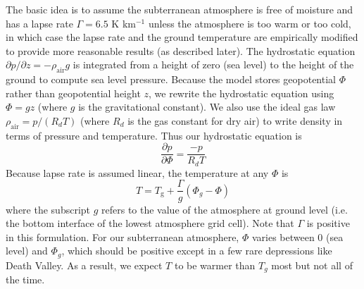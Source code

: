The basic idea is to assume the subterranean atmosphere is free of moisture and has a lapse rate $\Gamma = 6.5$ K km$^{-1}$ unless the atmosphere is too warm or too cold, in which case the lapse rate and the ground temperature are empirically modified to provide more reasonable results (as described later). The hydrostatic equation $\partial p/\partial z = -\rho_\mathrm{air} g$ is integrated from a height of zero (sea level) to the height of the ground to compute sea level pressure. Because the model stores geopotential $\Phi$ rather than geopotential height $z$, we rewrite the hydrostatic equation using $\Phi = gz$ (where $g$ is the gravitational constant). We also use the ideal gas law $\rho_\mathrm{air} = p/(R_d T)$ (where $R_d$ is the gas constant for dry air) to write density in terms of pressure and temperature. Thus our hydrostatic equation is
\begin{equation}
  \frac{\partial p}{\partial \Phi} = \frac{-p}{R_d T}
\label{eq:hydrostat}
\end{equation}
Because lapse rate is assumed linear, the temperature at any $\Phi$ is
\begin{equation}
  T = T_\mathrm{g} + \frac{\Gamma}{g}\left(\Phi_g - \Phi \right)
  \label{eq:T}
\end{equation}
where the subscript $g$ refers to the value of the atmosphere at ground level (i.e. the bottom interface of the lowest atmosphere grid cell). Note that $\Gamma$ is positive in this formulation. For our subterranean atmosphere, $\Phi$ varies between 0 (sea level) and $\Phi_g$, which should be positive except in a few rare depressions like Death Valley. As a result, we expect $T$ to be warmer than $T_g$ most but not all of the time. 

